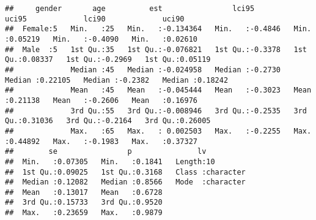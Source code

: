 \documentclass[
]{article}
\begin{document}
\begin{verbatim}
##     gender       age          est                lci95             uci95             lci90             uci90        
##  Female:5   Min.   :25   Min.   :-0.134364   Min.   :-0.4846   Min.   :0.05219   Min.   :-0.4090   Min.   :0.02610  
##  Male  :5   1st Qu.:35   1st Qu.:-0.076821   1st Qu.:-0.3378   1st Qu.:0.08337   1st Qu.:-0.2969   1st Qu.:0.05119  
##             Median :45   Median :-0.024958   Median :-0.2730   Median :0.22105   Median :-0.2382   Median :0.18242  
##             Mean   :45   Mean   :-0.045444   Mean   :-0.3023   Mean   :0.21138   Mean   :-0.2606   Mean   :0.16976  
##             3rd Qu.:55   3rd Qu.:-0.008946   3rd Qu.:-0.2535   3rd Qu.:0.31036   3rd Qu.:-0.2164   3rd Qu.:0.26005  
##             Max.   :65   Max.   : 0.002503   Max.   :-0.2255   Max.   :0.44892   Max.   :-0.1983   Max.   :0.37327  
##        se                p               lv           
##  Min.   :0.07305   Min.   :0.1841   Length:10         
##  1st Qu.:0.09025   1st Qu.:0.3168   Class :character  
##  Median :0.12082   Median :0.8566   Mode  :character  
##  Mean   :0.13017   Mean   :0.6728                     
##  3rd Qu.:0.15733   3rd Qu.:0.9520                     
##  Max.   :0.23659   Max.   :0.9879
\end{verbatim}
\end{document}
